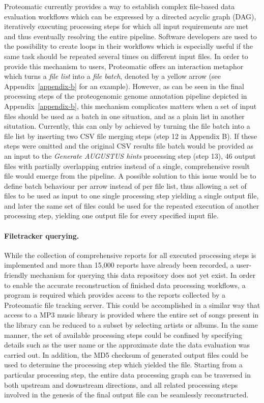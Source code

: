 Proteomatic currently provides a way to establish complex file-based data 
evaluation workflows which can be expressed by a directed acyclic graph (DAG),
iteratively executing processing steps for which all input requirements are
met and thus eventually resolving the entire pipeline.
Software developers are used to the possibility to create loops in their
workflows which is especially useful if the same task should be repeated
several times on different input files.
In order to provide this mechanism to users, Proteomatic offers an interaction 
metaphor which turns a {\em file list} into a {\em file batch}, denoted by a 
yellow arrow (see Appendix~\ref{appendix-b} for an example).
However, as can be seen in the final processing steps of the proteogenomic
genome annotation pipeline depicted in Appendix~\ref{appendix-b}, 
this mechanism complicates matters when
a set of input files should be used as a batch in one situation, and as a
plain list in another situtation.
Currently, this can only by achieved by turning the file batch into a file
list by inserting two CSV file merging steps (step 12 in Appendix B).
If these steps were omitted and the original CSV results file batch
would be provided as an input to the {\em Generate AUGUSTUS hints} processing
step (step 13), 46 output files with partially overlapping entries instead of
a single, comprehensive result file would emerge from the pipeline.
A possible solution to this issue would be to define batch behaviour per
arrow instead of per file list, thus allowing a set of files to be used as 
input to one single processing step yielding a single output file, and
later the same set of files could be used for the repeated execution of 
another processing step, yielding one output file for every specified input 
file.

\paragraph{Filetracker querying.}

While the collection of comprehensive reports for all executed processing steps
is implemented and more than 15,000 reports have already been recorded, a
user-friendly mechanism for querying this data repository does not yet exist.
In order to enable the accurate reconstruction of finished data processing 
workflows, a program is required which provides access to the reports collected
by a Proteomatic file tracking server.
This could be accomplished in a similar way that access to a MP3 music library 
is provided where the entire set of songs present in the library can be 
reduced to a subset by selecting artists or albums. 
In the same manner, the set of available processing steps could be confined
by specifying details such as the user name or the approximate date the data
evaluation was carried out.
In addition, the MD5 checksum of generated output files could be used to 
determine the processing step which yielded the file.
Starting from a particular processing step, the entire data processing graph
can be traversed in both upstream and downstream directions, and all related
processing steps involved in the genesis of the final output file can
be seamlessly reconstructed.

